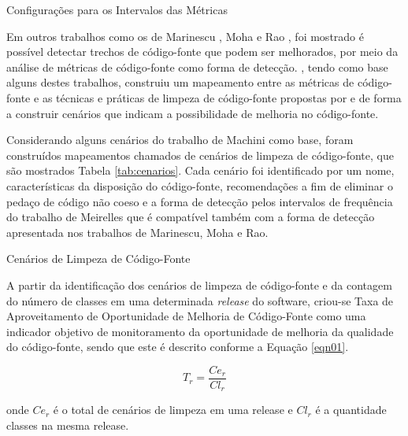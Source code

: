 	\begin{table}[!ht]
	\caption{Configurações para os Intervalos das Métricas}
	\addtolength{\belowcaptionskip}{2pt}
	\begin{center}
		
	\label{tab:good-metrics}
	\end{center}
	\end{table}
Em outros trabalhos como os de Marinescu  \cite{marinescu2005measurement}, Moha \cite{moha2010decor} e Rao \cite{rao2007detecting}, foi mostrado é possível detectar trechos de código-fonte que podem ser melhorados\cite{fowler1999refactoring}, por meio da análise de métricas de código-fonte como forma de detecção. \cite{Machini2010}, tendo como base alguns destes trabalhos, construiu um mapeamento entre as métricas de código-fonte e as técnicas e práticas de limpeza de código-fonte propostas por \cite{Martin2008} e \cite{beck2007implementation} de forma a construir cenários que indicam a possibilidade de melhoria no código-fonte.

Considerando alguns cenários do trabalho de Machini \cite{Machini2010} como base, foram construídos mapeamentos chamados de cenários de limpeza de código-fonte, que são mostrados Tabela \ref{tab:cenarios}. Cada cenário foi identificado por um nome, características da disposição do código-fonte, recomendações a fim de eliminar o pedaço de código não coeso e a forma de detecção pelos intervalos de frequência do trabalho de Meirelles \cite{Meirelles2013} que é compatível também com a forma de detecção apresentada nos trabalhos de Marinescu, Moha e Rao.
	
	\begin{table}[ht]
	\centering
	\caption{Cenários de Limpeza de Código-Fonte}
	\addtolength{\belowcaptionskip}{6pt}
		
	\label{tab:cenarios}
	\end{table}


A partir da identificação dos cenários de limpeza de código-fonte e da contagem do número de classes em uma determinada \textit{release} do software, criou-se Taxa de Aproveitamento de Oportunidade de Melhoria de Código-Fonte como uma indicador objetivo de monitoramento da oportunidade de melhoria da qualidade do código-fonte, sendo que este é descrito conforme a Equação \ref{eqn01}.

\begin{equation}
\label{eqn01}
T_r =   \frac{{{Ce_r}}}{{Cl_r}}
\end{equation}

onde $ Ce_r $ é o total de cenários de limpeza em uma release e $ Cl_r $ é a quantidade classes na mesma release.
